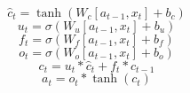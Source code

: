 \documentclass[10pt, conference, compsocconf]{IEEEtran}
\begin{document}
\begin{equation} \label{c} 
 \hat c_t= \tanh{(W_c[a_{t-1},x_t]+b_c)}
\end{equation}
\begin{equation} \label{update} 
 u_t= \sigma{(W_u[a_{t-1},x_t]+b_u)}
\end{equation}
\begin{equation} \label{foreget} 
 f_t= \sigma{(W_f[a_{t-1},x_t]+b_f)}
\end{equation}
\begin{equation} \label{output} 
 o_t= \sigma{(W_o[a_{t-1},x_t]+b_o)}
 \end{equation}
\begin{equation} \label{cell} 
 c_t= u_t* \hat c_t +f_t* c_{t-1}
 \end{equation}
 \begin{equation} \label{a} 
 a_t= o_t *\tanh( c_t)
 \end{equation}
\end{document}
